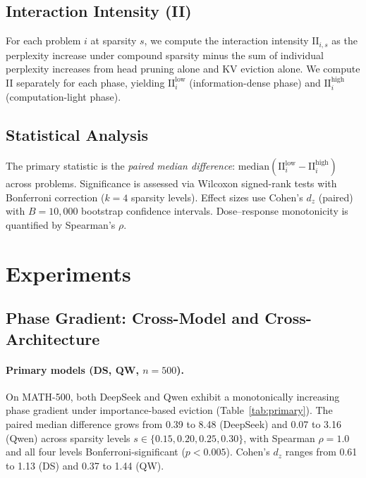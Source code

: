 \documentclass[11pt,a4paper]{article}
\begin{document}
\subsection{Interaction Intensity (II)}

For each problem $i$ at sparsity $s$, we compute the interaction intensity $\mathrm{II}_{i,s}$ as the perplexity increase under compound sparsity minus the sum of individual perplexity increases from head pruning alone and KV eviction alone. We compute II separately for each phase, yielding $\mathrm{II}^{\mathrm{low}}_i$ (information-dense phase) and $\mathrm{II}^{\mathrm{high}}_i$ (computation-light phase).

\subsection{Statistical Analysis}

The primary statistic is the \emph{paired median difference}: $\mathrm{median}(\mathrm{II}^{\mathrm{low}}_i - \mathrm{II}^{\mathrm{high}}_i)$ across problems. Significance is assessed via Wilcoxon signed-rank tests with Bonferroni correction ($k=4$ sparsity levels). Effect sizes use Cohen's $d_z$ (paired) with $B=10{,}000$ bootstrap confidence intervals. Dose--response monotonicity is quantified by Spearman's $\rho$.

\section{Experiments}
\label{sec:experiments}

\subsection{Phase Gradient: Cross-Model and Cross-Architecture}
\label{sec:cross-arch}

\paragraph{Primary models (DS, QW, $n=500$).}
On MATH-500, both DeepSeek and Qwen exhibit a monotonically increasing phase gradient under importance-based eviction (Table~\ref{tab:primary}). The paired median difference grows from 0.39 to 8.48 (DeepSeek) and 0.07 to 3.16 (Qwen) across sparsity levels $s \in \{0.15, 0.20, 0.25, 0.30\}$, with Spearman $\rho = 1.0$ and all four levels Bonferroni-significant ($p < 0.005$). Cohen's $d_z$ ranges from 0.61 to 1.13 (DS) and 0.37 to 1.44 (QW).
\end{document}
